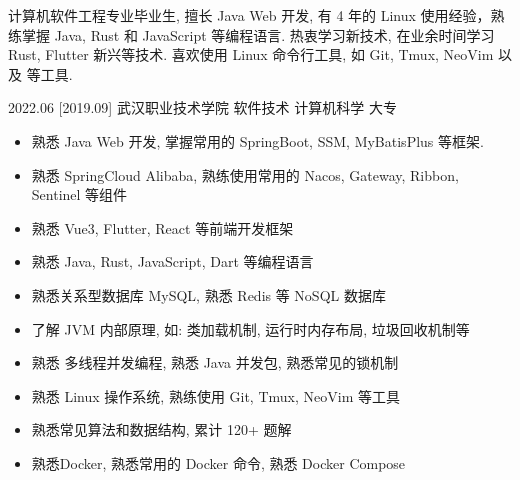 \documentclass[zh]{resume}
\begin{document}
\makeheader

{\onehalfspacing\hspace{2em}%
	计算机软件工程专业毕业生, 擅长 Java Web 开发,
	有 4 年的 Linux 使用经验，熟练掌握 Java, Rust 和 JavaScript 等编程语言.
	热衷学习新技术, 在业余时间学习 Rust, Flutter 新兴等技术.
	喜欢使用 Linux 命令行工具, 如 Git, Tmux, NeoVim
	以及  等工具.
	\par}

\begin{competences}
\end{competences}

\begin{educations}
	\education%
	{2022.06}%
	[2019.09]%
	{武汉职业技术学院}%
	{软件技术}%
	{计算机科学}%
	{大专}
\end{educations}

\begin{itemize}
	\item 熟悉 Java Web 开发, 掌握常用的 SpringBoot, SSM, MyBatisPlus 等框架.
	\item 熟悉 SpringCloud Alibaba, 熟练使用常用的 Nacos, Gateway, Ribbon, Sentinel 等组件
	\item 熟悉 Vue3, Flutter, React 等前端开发框架
	\item 熟悉 Java, Rust, JavaScript, Dart 等编程语言
	\item 熟悉关系型数据库 MySQL, 熟悉 Redis 等 NoSQL 数据库
	\item 了解 JVM 内部原理, 如: 类加载机制, 运行时内存布局, 垃圾回收机制等
	\item 熟悉 多线程并发编程, 熟悉 Java 并发包, 熟悉常见的锁机制
	\item 熟悉 Linux 操作系统, 熟练使用 Git, Tmux, NeoVim 等工具
	\item 熟悉常见算法和数据结构,  累计 120+ 题解
	\item 熟悉Docker, 熟悉常用的 Docker 命令, 熟悉 Docker Compose
\end{itemize}
\end{document}
